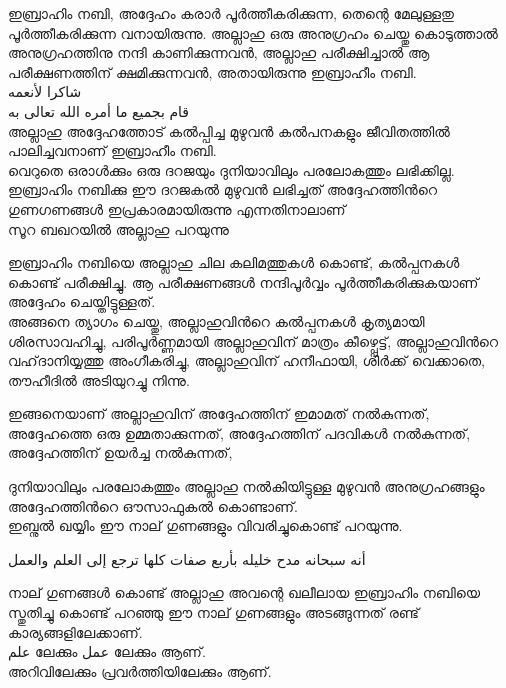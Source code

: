 ഇബ്രാഹിം നബി, അദ്ദേഹം കരാർ പൂർത്തീകരിക്കുന്ന, തെന്റെ മേലുള്ളതു  പൂർത്തീകരിക്കുന്ന വനായിരുന്നു.  അല്ലാഹു ഒരു അനുഗ്രഹം  ചെയ്തു  കൊടുത്താൽ അനുഗ്രഹത്തിനു നന്ദി കാണിക്കുന്നവൻ,  അല്ലാഹു പരീക്ഷിച്ചാൽ ആ പരീക്ഷണത്തിന് ക്ഷമിക്കുന്നവൻ,  അതായിരുന്നു ഇബ്രാഹീം നബി. \\
 
  \textarabic{شاكرا لأنعمه} \\
  
  \textarabic{قام بجميع ما أمره الله تعالى به} \\
 അല്ലാഹു അദ്ദേഹത്തോട് കൽപ്പിച്ച മുഴുവൻ കൽപനകളും ജീവിതത്തിൽ പാലിച്ചവനാണ് ഇബ്രാഹീം നബി. \\
 
 വെറുതെ ഒരാൾക്കും ഒരു ദറജയും ദുനിയാവിലും പരലോകത്തും ലഭിക്കില്ല.  ഇബ്രാഹിം നബിക്കു ഈ ദറജകൽ മുഴുവൻ ലഭിച്ചത് 
 അദ്ദേഹത്തിൻറെ ഗുണഗണങ്ങൾ ഇപ്രകാരമായിരുന്നു എന്നതിനാലാണ് \\
 
 സൂറ ബഖറയിൽ അല്ലാഹു പറയുന്നു \\
    \textarabic{\quranayah[2][124]} 
    
    
    ഇബ്രാഹിം നബിയെ അല്ലാഹു ചില കലിമത്തുകൾ കൊണ്ട്, കൽപ്പനകൾ കൊണ്ട് പരീക്ഷിച്ചു.  ആ പരീക്ഷണങ്ങൾ നന്ദിപൂർവ്വം പൂർത്തീകരിക്കുകയാണ് 
    അദ്ദേഹം ചെയ്തിട്ടുള്ളത്. \\
    
    
അങ്ങനെ ത്യാഗം ചെയ്തു,  അല്ലാഹുവിൻറെ കൽപ്പനകൾ കൃത്യമായി ശിരസാവഹിച്ചു,  പരിപൂർണ്ണമായി അല്ലാഹുവിന് മാത്രം കീഴ്പ്പെട്ട്, അല്ലാഹുവിൻറെ വഹ്‌ദാനിയ്യത്തു അംഗീകരിച്ചു,  അല്ലാഹുവിന് ഹനീഫായി, ശിർക്ക് വെക്കാതെ, തൗഹീദിൽ അടിയുറച്ചു നിന്നു. 

ഇങ്ങനെയാണ് അല്ലാഹുവിന് 
അദ്ദേഹത്തിന് ഇമാമത് നൽകുന്നത്,
അദ്ദേഹത്തെ ഒരു ഉമ്മതാക്കുന്നത്,
അദ്ദേഹത്തിന് പദവികൾ നൽകുന്നത്,
അദ്ദേഹത്തിന് ഉയർച്ച നൽകുന്നത്, 

ദുനിയാവിലും പരലോകത്തും 
അല്ലാഹു നൽകിയിട്ടുള്ള മുഴുവൻ അനുഗ്രഹങ്ങളും അദ്ദേഹത്തിൻറെ ഔസാഫുകൽ  കൊണ്ടാണ്. \\


ഇബ്നുൽ ഖയ്യിം ഈ നാല് ഗുണങ്ങളും വിവരിച്ചുകൊണ്ട് പറയുന്നു. 

\textarabic{أنه سبحانه مدح خليله بأربع صفات كلها ترجع إلى العلم والعمل}


 നാല് ഗുണങ്ങൾ കൊണ്ട് അല്ലാഹു അവന്റെ ഖലീലായ ഇബ്രാഹിം നബിയെ സ്തുതിച്ചു കൊണ്ട് പറഞ്ഞു 
ഈ നാല് ഗുണങ്ങളും അടങ്ങുന്നത് രണ്ട് കാര്യങ്ങളിലേക്കാണ്. \\
\textarabic{علم} ലേക്കും \textarabic{عمل} ലേക്കും ആണ്. \\ അറിവിലേക്കും പ്രവർത്തിയിലേക്കും ആണ്. \\

